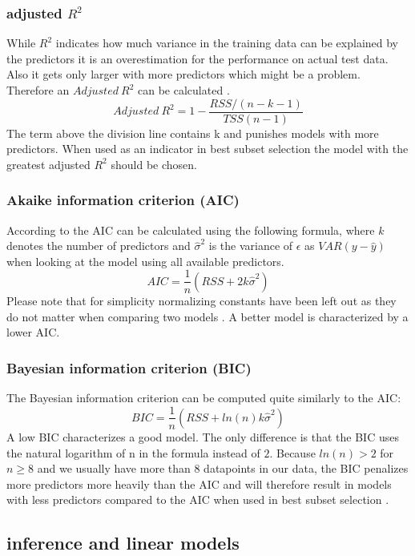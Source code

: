 \documentclass[12 pt]{scrartcl}
\begin{document}
\subsubsection{adjusted $R^2$}

While $R^2$ indicates how much variance in the training data can be explained by the predictors it is an overestimation for the performance on actual test data. Also it gets only larger with more predictors which might be a problem. Therefore an $Adjusted \: R^2$ can be calculated \citep[p.~234]{james2013introduction}.
\[Adjusted \: R^2 = 1- \frac{RSS/(n-k-1)}{TSS(n-1)}\]
The term above the division line contains k and punishes models with more predictors. When used as an indicator in best subset selection the model with the greatest adjusted $R^2$ should be chosen.

\subsubsection{Akaike information criterion (AIC) }
According to \citet[p.~234]{james2013introduction} the AIC can be calculated using the following formula, where $k$ denotes the number of predictors and $\hat{\sigma}^2$ is  the variance of $\epsilon$ as $VAR(y-\hat{y})$ when looking at the model using all available predictors.
\[AIC = \frac{1}{n}(RSS + 2k\hat{\sigma}^2)\]
Please note that for simplicity normalizing constants have been left out as they do not matter when comparing two models \citep[p.~234]{james2013introduction}.
A better model is characterized by a lower AIC.

\subsubsection{Bayesian information criterion (BIC) }

The Bayesian information criterion can be computed quite similarly to the AIC:
\[BIC = \frac{1}{n}(RSS + ln(n)k\hat{\sigma}^2)\]
A low BIC characterizes a good model. The only difference is that the BIC uses the natural logarithm of n in the formula instead of $2$. Because $ln(n) > 2$ for $n \ge 8$ and we usually have more than 8 datapoints in our data, the BIC penalizes more predictors more heavily than the AIC and will therefore result in models with less predictors compared to the AIC when used in best subset selection \citep[p.~234]{james2013introduction}.

\subsection{inference and linear models}
\end{document}
